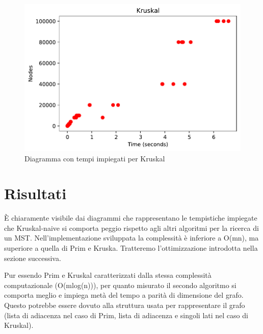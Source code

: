 \begin{figure}[htp]
    \centering
    \includegraphics[width=\textwidth]{immagini/kruskal.pdf}
    \caption{Diagramma con tempi impiegati per Kruskal}
    \label{fig:diagramma-kruskal}
\end{figure}

\clearpage

\section{Risultati\label{sec:risultati}}
È chiaramente visibile dai diagrammi che rappresentano le tempistiche impiegate che Kruskal-naive si comporta peggio rispetto agli altri algoritmi per la ricerca di un MST.
Nell'implementazione sviluppata la complessità è inferiore a O(mn), ma superiore a quella di Prim e Kruska.
Tratteremo l'ottimizzazione introdotta nella sezione successiva.

Pur essendo Prim e Kruskal caratterizzati dalla stessa complessità computazionale (O(mlog(n))), per quanto misurato il secondo algoritmo si comporta meglio e impiega metà del tempo a parità di dimensione del grafo.
Questo potrebbe essere dovuto alla struttura usata per rappresentare il grafo (lista di adiacenza nel caso di Prim, lista di adiacenza e singoli lati nel caso di Kruskal).